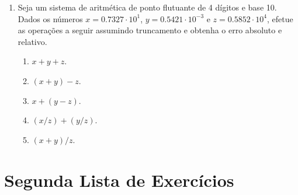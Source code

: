 \documentclass[
	12pt,				%
	openright,			%
	twoside,			%
	a4paper,			%
	english,			%
	french,				%
	brazil,				%
	sumario=tradicional
]{abntex2}
\numberwithin{example}{chapter}
\numberwithin{remark}{chapter}
\numberwithin{definition}{chapter}
\numberwithin{figure}{chapter}
\begin{document}
\begin{enumerate}
    \item Seja um sistema de aritmética de ponto flutuante de 4 dígitos e base 10. Dados os números $x=0.7327\cdot 10^1$, $y=0.5421\cdot 10^{-3}$ e $z=0.5852\cdot 10^4$, efetue as operações a seguir assumindo truncamento e obtenha o erro absoluto e relativo.
        \begin{enumerate}
            \item $x+y+z$.
            \item $(x+y)-z$.
            \item $x+(y-z)$.
            \item $(x/z)+(y/z)$.
            \item $(x+y)/z$.
        \end{enumerate}
\end{enumerate}

\section{Segunda Lista de Exercícios}
\end{document}
